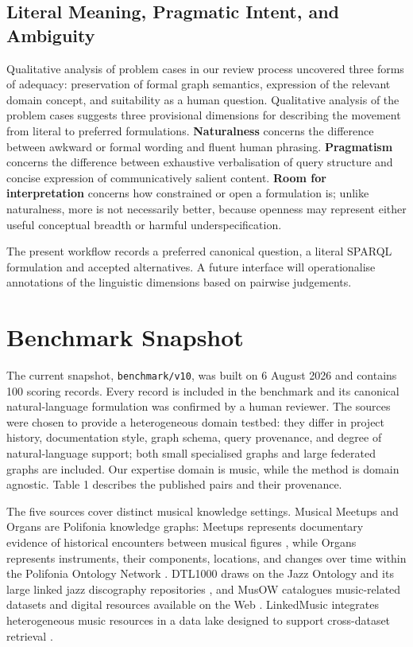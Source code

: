 \subsection{Literal Meaning, Pragmatic Intent, and Ambiguity}\label{literal-meaning-pragmatic-intent-and-ambiguity}

Qualitative analysis of problem cases in our review process uncovered three forms of adequacy: preservation of formal graph semantics, expression of the relevant domain concept, and suitability as a human question. Qualitative analysis of the problem cases suggests three provisional dimensions for describing the movement from literal to preferred formulations. \textbf{Naturalness} concerns the difference between awkward or formal wording and fluent human phrasing. \textbf{Pragmatism} concerns the difference between exhaustive verbalisation of query structure and concise expression of communicatively salient content. \textbf{Room for interpretation} concerns how constrained or open a formulation is; unlike naturalness, more is not necessarily better, because openness may represent either useful conceptual breadth or harmful underspecification.

The present workflow records a preferred canonical question, a literal SPARQL formulation and accepted alternatives. A future interface will operationalise annotations of the linguistic dimensions based on pairwise judgements.

\section{Benchmark Snapshot}\label{benchmark-snapshot}

The current snapshot, \texttt{benchmark/v10}, was built on 6 August 2026 and contains 100 scoring records. Every record is included in the benchmark and its canonical natural-language formulation was confirmed by a human reviewer. The sources were chosen to provide a heterogeneous domain testbed: they differ in project history, documentation style, graph schema, query provenance, and degree of natural-language support; both small specialised graphs and large federated graphs are included. Our expertise domain is music, while the method is domain agnostic. Table 1 describes the published pairs and their provenance.

The five sources cover distinct musical knowledge settings. Musical Meetups and Organs are Polifonia knowledge graphs: Meetups represents documentary evidence of historical encounters between musical figures \citep{morales2024mmkg, morales2023meetups}, while Organs represents instruments, their components, locations, and changes over time within the Polifonia Ontology Network \citep{deberardinis2023polifonia}. DTL1000 draws on the Jazz Ontology and its large linked jazz discography repositories \citep{proutskova2022jazz}, and MusOW catalogues music-related datasets and digital resources available on the Web \citep{daquino2017musical}. LinkedMusic integrates heterogeneous music resources in a data lake designed to support cross-dataset retrieval \citep{pond2025sesemmi}.

